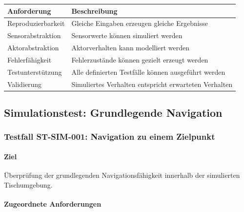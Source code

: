\documentclass[
  a4paper,
  12pt,
  DIV=12,        %
  parskip=half,  %
  headings=small %
]{scrartcl}
\theoremstyle{definition}
\theoremstyle{definition}
\begin{document}
\begin{longtable}[]{@{}
  >{\raggedright\arraybackslash}p{}
  >{\raggedright\arraybackslash}p{}@{}}
\toprule\noalign{}
\begin{minipage}[b]{\linewidth}\raggedright
Anforderung
\end{minipage} & \begin{minipage}[b]{\linewidth}\raggedright
Beschreibung
\end{minipage} \\
\midrule\noalign{}
\endhead
\bottomrule\noalign{}
\endlastfoot
Reproduzierbarkeit & Gleiche Eingaben erzeugen gleiche Ergebnisse \\
Sensorabstraktion & Sensorwerte können simuliert werden \\
Aktorabstraktion & Aktorverhalten kann modelliert werden \\
Fehlerfähigkeit & Fehlerzustände können gezielt erzeugt werden \\
Testunterstützung & Alle definierten Testfälle können ausgeführt
werden \\
Validierung & Simuliertes Verhalten entspricht erwarteten Verhalten \\
\end{longtable}

\subsection{Simulationstest: Grundlegende
Navigation}\label{simulationstest-grundlegende-navigation}

\subsubsection{Testfall ST-SIM-001: Navigation zu einem
Zielpunkt}\label{testfall-st-sim-001-navigation-zu-einem-zielpunkt}

\paragraph{Ziel}\label{ziel-16}

Überprüfung der grundlegenden Navigationsfähigkeit innerhalb der
simulierten Tischumgebung.

\paragraph{Zugeordnete
Anforderungen}\label{zugeordnete-anforderungen-16}
\end{document}
